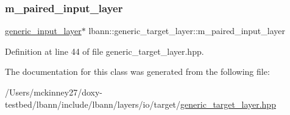 \subsubsection{\texorpdfstring{m\+\_\+paired\+\_\+input\+\_\+layer}{m\_paired\_input\_layer}}
{\footnotesize\ttfamily \hyperlink{classlbann_1_1generic__input__layer}{generic\+\_\+input\+\_\+layer}$\ast$ lbann\+::generic\+\_\+target\+\_\+layer\+::m\+\_\+paired\+\_\+input\+\_\+layer\hspace{0.3cm}{\ttfamily [protected]}}



Definition at line 44 of file generic\+\_\+target\+\_\+layer.\+hpp.



The documentation for this class was generated from the following file\+:\begin{DoxyCompactItemize}
\item 
/\+Users/mckinney27/doxy-\/testbed/lbann/include/lbann/layers/io/target/\hyperlink{generic__target__layer_8hpp}{generic\+\_\+target\+\_\+layer.\+hpp}\end{DoxyCompactItemize}
